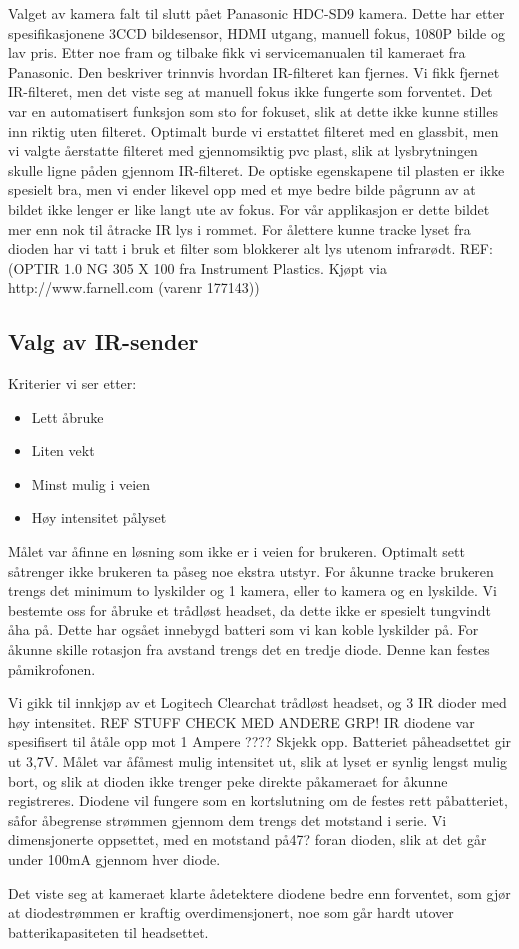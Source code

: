 		Valget av kamera falt til slutt p\aa et Panasonic HDC-SD9 kamera. Dette har etter spesifikasjonene 3CCD bildesensor, HDMI utgang, manuell fokus, 1080P bilde og lav pris. Etter noe fram og tilbake fikk vi servicemanualen til kameraet fra Panasonic. Den beskriver trinnvis hvordan IR-filteret kan fjernes. Vi fikk fjernet IR-filteret, men det viste seg at manuell fokus ikke fungerte som forventet. Det var en automatisert funksjon som sto for fokuset, slik at dette ikke kunne stilles inn riktig uten filteret. Optimalt burde vi erstattet filteret med en glassbit, men vi valgte \aa \space erstatte filteret med gjennomsiktig pvc plast, slik at lysbrytningen skulle ligne p\aa \space den gjennom IR-filteret. De optiske egenskapene til plasten er ikke spesielt bra, men vi ender likevel opp med et mye bedre bilde p\aa grunn av at bildet ikke lenger er like langt ute av fokus. For v\aa r applikasjon er dette bildet mer enn nok til \aa \space tracke IR lys i rommet. For \aa \space lettere kunne tracke lyset fra dioden har vi tatt i bruk et filter som blokkerer alt lys utenom infrar\o dt. REF: (OPTIR 1.0 NG 305 X 100 fra Instrument Plastics. Kj\o pt via http://www.farnell.com (varenr 177143))
		
	\subsection{Valg av IR-sender}
		
		Kriterier vi ser etter:
	
		\begin{itemize}
			\item Lett \aa \space bruke
			\item Liten vekt
			\item Minst mulig i veien
			\item H\o y intensitet p\aa lyset
		\end{itemize}

		M\aa let var \aa \space finne en l\o sning som ikke er i veien for brukeren. Optimalt sett s\aa trenger ikke brukeren ta p\aa \space seg noe ekstra utstyr. For \aa \space kunne tracke brukeren trengs det minimum to lyskilder og 1 kamera, eller to kamera og en lyskilde. Vi bestemte oss for \aa \space bruke et tr\aa dl\o st headset, da dette ikke er spesielt tungvindt \aa \space ha p\aa. Dette har ogs\aa et innebygd batteri som vi kan koble lyskilder p\aa . For \aa \space kunne skille rotasjon fra avstand trengs det en tredje diode. Denne kan festes p\aa \space mikrofonen.

		Vi gikk til innkj\o p av et Logitech Clearchat tr\aa dl\o st headset, og 3 IR dioder med h\o y intensitet. REF STUFF CHECK MED ANDERE GRP! IR diodene var spesifisert til \aa \space t\aa le opp mot 1 Ampere ???? Skjekk opp. Batteriet p\aa headsettet gir ut 3,7V. M\aa let var \aa \space f\aa \space mest mulig intensitet ut, slik at lyset er synlig lengst mulig bort, og slik at dioden ikke trenger peke direkte p\aa kameraet for \aa \space kunne registreres. Diodene vil fungere som en kortslutning om de festes rett p\aa batteriet, s\aa for \aa \space begrense str\o mmen gjennom dem trengs det motstand i serie. Vi dimensjonerte oppsettet, med en motstand p\aa 47? foran dioden, slik at det g\aa r under 100mA gjennom hver diode.

		Det viste seg at kameraet klarte \aa \space detektere diodene bedre enn forventet, som gj\o r at diodestr\o mmen er kraftig overdimensjonert, noe som g\aa r hardt utover batterikapasiteten til headsettet.